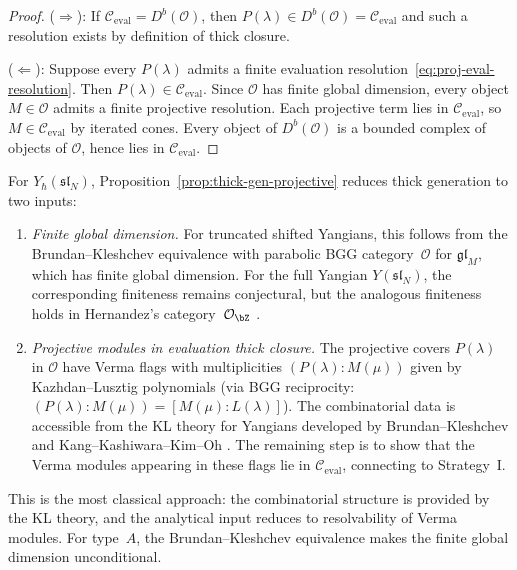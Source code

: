 \begin{proof}
($\Rightarrow$):
If $\mathcal{C}_{\mathrm{eval}} = D^b(\mathcal{O})$, then
$P(\lambda) \in D^b(\mathcal{O}) = \mathcal{C}_{\mathrm{eval}}$
and such a resolution exists by definition of thick closure.

($\Leftarrow$):
Suppose every $P(\lambda)$ admits a finite evaluation
resolution~\eqref{eq:proj-eval-resolution}. Then
$P(\lambda) \in \mathcal{C}_{\mathrm{eval}}$. Since $\mathcal{O}$
has finite global dimension, every object $M \in \mathcal{O}$ admits
a finite projective resolution. Each projective term lies in
$\mathcal{C}_{\mathrm{eval}}$, so $M \in
\mathcal{C}_{\mathrm{eval}}$ by iterated cones. Every object of
$D^b(\mathcal{O})$ is a bounded complex of objects of
$\mathcal{O}$, hence lies in $\mathcal{C}_{\mathrm{eval}}$.
\end{proof}

\begin{remark}
\label{rem:kl-input-yangian}
For $Y_\hbar(\mathfrak{sl}_N)$,
Proposition~\ref{prop:thick-gen-projective} reduces thick generation
to two inputs:
\begin{enumerate}[label=\textup{(\alph*)}]
\item \emph{Finite global dimension.}
 For truncated shifted Yangians, this follows from the
 Brundan--Kleshchev equivalence \cite{BrunKlesh06} with parabolic
 BGG category~$\mathcal{O}$ for $\mathfrak{gl}_M$, which has
 finite global dimension. For the full Yangian
 $Y(\mathfrak{sl}_N)$, the corresponding finiteness remains
 conjectural, but the analogous finiteness holds in Hernandez's
 category~$\mathcal{O}_\bZ$ \cite{Hernandez05}.
\item \emph{Projective modules in evaluation thick closure.}
 The projective covers $P(\lambda)$ in $\mathcal{O}$ have Verma
 flags with multiplicities $(P(\lambda) : M(\mu))$ given by
 Kazhdan--Lusztig polynomials (via BGG reciprocity:
 $(P(\lambda) : M(\mu)) = [M(\mu) : L(\lambda)]$).
 The combinatorial data is accessible from the KL theory for
 Yangians developed by Brundan--Kleshchev \cite{BrunKlesh06} and
 Kang--Kashiwara--Kim--Oh \cite{KKKO18}. The remaining step is
 to show that the Verma modules appearing in these flags lie in
 $\mathcal{C}_{\mathrm{eval}}$, connecting to Strategy~I\@.
\end{enumerate}
This is the most classical approach: the combinatorial structure is
provided by the KL theory, and the analytical input reduces to
resolvability of Verma modules. For type~$A$, the
Brundan--Kleshchev equivalence makes the finite global dimension
unconditional.
\end{remark}


